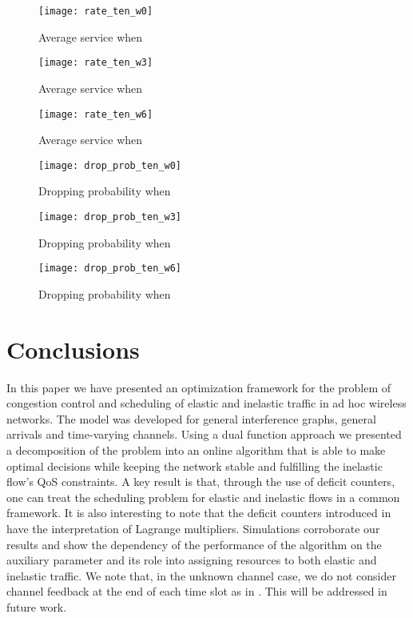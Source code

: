 \documentclass[conference]{IEEEtran}
\begin{document}
\begin{figure}[t]
	\centering
	\texttt{[image: rate\_ten\_w0]}
	\caption{Average service when }
	\label{rate_ten_w0}
\end{figure}
\begin{figure}[t]
	\centering
	\texttt{[image: rate\_ten\_w3]}
	\caption{Average service when }
	\label{rate_ten_w3}
\end{figure}
\begin{figure}[t]
	\centering
	\texttt{[image: rate\_ten\_w6]}
	\caption{Average service when }
	\label{rate_ten_w6}
\end{figure}

\begin{figure}[t]
	\centering
	\texttt{[image: drop\_prob\_ten\_w0]}
	\caption{Dropping probability when }
	\label{drop_prob_ten_w0}
\end{figure}
\begin{figure}[t]
	\centering
	\texttt{[image: drop\_prob\_ten\_w3]}
	\caption{Dropping probability when }
	\label{drop_prob_ten_w3}
\end{figure}
\begin{figure}[t]
	\centering
	\texttt{[image: drop\_prob\_ten\_w6]}
	\caption{Dropping probability when }
	\label{drop_prob_ten_w6}
\end{figure}

\section{Conclusions}

In this paper we have presented an optimization framework for the problem of congestion control and scheduling of elastic and inelastic traffic in ad hoc wireless networks. The model was developed for general interference graphs, general arrivals and time-varying channels. Using a dual function approach we presented a decomposition of the problem into an online algorithm that is able to make optimal decisions while keeping the network stable and fulfilling the inelastic flow's QoS constraints. A key result is that, through the use of deficit counters, one can treat the scheduling problem for elastic and inelastic flows in a common framework. It is also interesting to note that the deficit counters introduced in \cite{Hou09a, Hou09b, Hou09c} have the interpretation of Lagrange multipliers. Simulations corroborate our results and show the dependency of the performance of the algorithm on the auxiliary parameter  and its role into assigning resources to both elastic and inelastic traffic. We note that, in the unknown channel case, we do not consider channel feedback at the end of each time slot as in \cite{Hou09a, Hou09b, Hou09c}. This will be addressed in future work.
\end{document}
